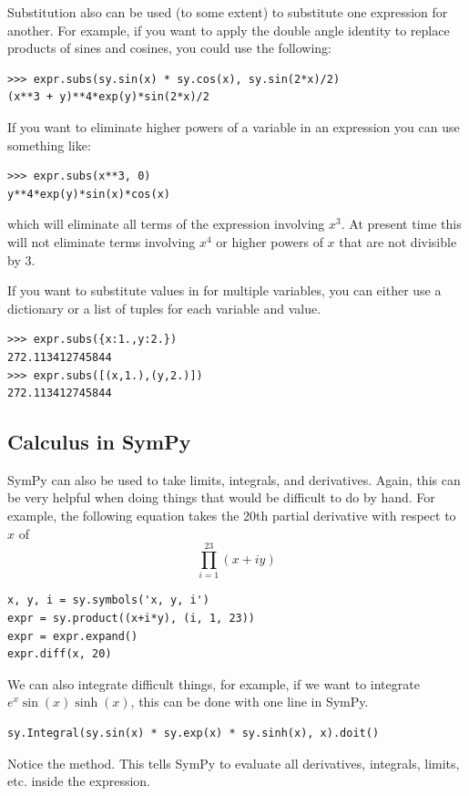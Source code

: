 Substitution also can be used (to some extent) to substitute one expression for another.
For example, if you want to apply the double angle identity to replace products of sines and cosines, you could use the following:
\begin{lstlisting}
>>> expr.subs(sy.sin(x) * sy.cos(x), sy.sin(2*x)/2)
(x**3 + y)**4*exp(y)*sin(2*x)/2
\end{lstlisting}
If you want to eliminate higher powers of a variable in an expression you can use something like:
\begin{lstlisting}
>>> expr.subs(x**3, 0)
y**4*exp(y)*sin(x)*cos(x)
\end{lstlisting}
which will eliminate all terms of the expression involving $x^3$.
At present time this will not eliminate terms involving $x^4$ or higher powers of $x$ that are not divisible by 3.

If you want to substitute values in for multiple variables, you can either use a dictionary or a list of tuples for each variable and value.
\begin{lstlisting}
>>> expr.subs({x:1.,y:2.})
272.113412745844
>>> expr.subs([(x,1.),(y,2.)])
272.113412745844
\end{lstlisting}

\subsection*{Calculus in SymPy}
SymPy can also be used to take limits, integrals, and derivatives.
Again, this can be very helpful when doing things that would be difficult to do by hand.
For example, the following equation takes the 20th partial derivative with respect to $x$ of
\begin{equation*}
\prod_{i=1}^{23} \left(x+i y\right)
\end{equation*}
\begin{lstlisting}
x, y, i = sy.symbols('x, y, i')
expr = sy.product((x+i*y), (i, 1, 23))
expr = expr.expand()
expr.diff(x, 20)
\end{lstlisting}

We can also integrate difficult things, for example, if we want to integrate $e^x\sin(x)\sinh(x)$, this can be done with one line in SymPy.
\begin{lstlisting}
sy.Integral(sy.sin(x) * sy.exp(x) * sy.sinh(x), x).doit()
\end{lstlisting}
Notice the  method.
This tells SymPy to evaluate all derivatives, integrals, limits, etc. inside the expression.

